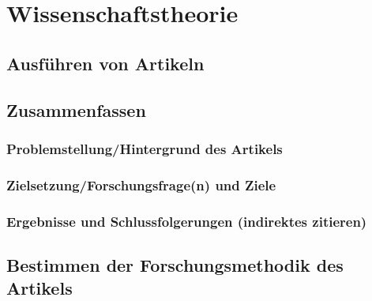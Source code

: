 \section{Wissenschaftstheorie}

\subsection{Ausführen von Artikeln}
\lipsum[1-2]
\subsection{Zusammenfassen}

\subsubsection{Problemstellung/Hintergrund des Artikels}
\lipsum[1-2]

\subsubsection{Zielsetzung/Forschungsfrage(n) und Ziele}
\lipsum[1-2]

\subsubsection{Ergebnisse und Schlussfolgerungen (indirektes zitieren)}
\lipsum[1-2]

\subsection{Bestimmen der Forschungsmethodik des Artikels}
\lipsum[1-2]